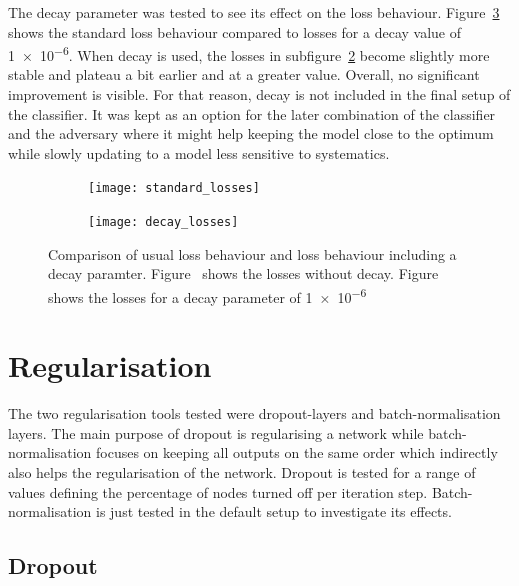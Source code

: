 The decay parameter was tested to see its effect on the loss behaviour. Figure~\ref{fig:decay} shows the standard loss behaviour compared to losses for a decay value of \num{1e-6}. When decay is used, the losses in subfigure~\ref{fig:decay:decay} become slightly more stable and plateau a bit earlier and at a greater value. Overall, no significant improvement is visible. For that reason, decay is not included in the final setup of the classifier. It was kept as an option for the later combination of the classifier and the adversary where it might help keeping the model close to the optimum while slowly updating to a model less sensitive to systematics.

\begin{figure}[htbp]
    \centering
    \begin{subfigure}[b]{0.45\textwidth}
        \texttt{[image: standard\_losses]}
        \caption{}
        \label{fig:decay:standard}
    \end{subfigure}
\quad
    \begin{subfigure}[b]{0.45\textwidth}
        \texttt{[image: decay\_losses]}
        \caption{}
        \label{fig:decay:decay}
    \end{subfigure}
    \caption[Performance of the classifier with decay]{Comparison of usual loss behaviour and loss behaviour including a decay paramter. Figure~ shows the losses without decay. Figure~ shows the losses for a decay parameter of \num{1e-6}}
	\label{fig:decay}
\end{figure}




\section{Regularisation}

The two regularisation tools tested were dropout-layers and batch-normalisation layers. The main purpose of dropout is regularising a network while batch-normalisation focuses on keeping all outputs on the same order which indirectly also helps the regularisation of the network.
Dropout is tested for a range of values defining the percentage of nodes turned off per iteration step. Batch-normalisation is just tested in the default setup to investigate its effects.

\subsection{Dropout}
\label{sec:simple_dropout}

